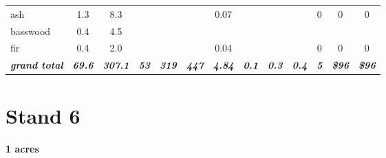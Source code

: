 \documentclass[landscape]{article}
\begin{document}
\begin{table}[H]
\begin{tabular}[t]{lcccccccccccc}
\rowcolor{gray!6}  ash & 1.3 & 8.3 &  &  &  & 0.07 &  &  &  & 0 & 0 & 0\\
 
basswood & 0.4 & 4.5 &  &  &  &  &  &  &  &  &  & \\
 
\rowcolor{gray!6}  fir & 0.4 & 2.0 &  &  &  & 0.04 &  &  &  & 0 & 0 & 0\\
 
\rowcolor[HTML]{DCDCDC}  \em{\textbf{grand total}} & \em{\textbf{69.6}} & \em{\textbf{307.1}} & \em{\textbf{53}} & \em{\textbf{319}} & \em{\textbf{447}} & \em{\textbf{4.84}} & \em{\textbf{0.1}} & \em{\textbf{0.3}} & \em{\textbf{0.4}} & \em{\textbf{5}} & \em{\textbf{\$96}} & \em{\textbf{\$96}}\\
\bottomrule
\end{tabular}
\end{table}

\pagebreak

\section{Stand 6}\label{stand-6}

\textbf{1 acres}
\end{document}
